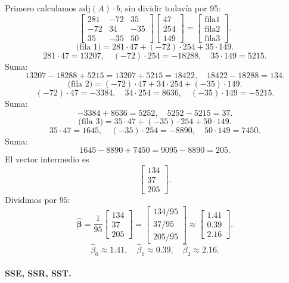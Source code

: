 \documentclass[10pt,a4paper]{article}
\begin{document}
\begin{enumerate}
Primero calculamos 
\(\mathrm{adj}(A)\cdot b\),
sin dividir todavía por 95:
\[
\begin{bmatrix}
281 & -72 & 35\\
-72 & 34 & -35\\
35 & -35 & 50
\end{bmatrix}
\begin{bmatrix}
47\\
254\\
149
\end{bmatrix}
=
\begin{bmatrix}
\text{fila1}\\
\text{fila2}\\
\text{fila3}
\end{bmatrix}.
\]
\[
\text{(fila 1)} 
= 281\cdot47 + (-72)\cdot254 + 35\cdot149.
\]
\[
281\cdot47=13207,\quad
(-72)\cdot254=-18288,\quad
35\cdot149=5215.
\]
Suma:
\[
13207 -18288 +5215= 13207 +5215=18422,\quad 18422-18288=134.
\]
\[
\text{(fila 2)}
= (-72)\cdot47 +34\cdot254 +(-35)\cdot149.
\]
\[
(-72)\cdot47=-3384,\quad
34\cdot254=8636,\quad
(-35)\cdot149=-5215.
\]
Suma:
\[
-3384+8636=5252,\quad 5252-5215=37.
\]
\[
\text{(fila 3)}
= 35\cdot47 +(-35)\cdot254 +50\cdot149.
\]
\[
35\cdot47=1645,\quad
(-35)\cdot254=-8890,\quad
50\cdot149=7450.
\]
Suma:
\[
1645-8890 +7450=9095-8890=205.
\]
El vector intermedio es
\[
\begin{bmatrix}
134\\
37\\
205
\end{bmatrix}.
\]
Dividimos por $95$:
\[
\hat{\boldsymbol{\beta}}
=
\frac{1}{95}
\begin{bmatrix}
134\\
37\\
205
\end{bmatrix}
=
\begin{bmatrix}
134/95\\
37/95\\
205/95
\end{bmatrix}
\approx
\begin{bmatrix}
1.41\\
0.39\\
2.16
\end{bmatrix}.
\]
\[
\boxed{
\hat{\beta}_0 \approx 1.41,
\quad
\hat{\beta}_1 \approx 0.39,
\quad
\hat{\beta}_2 \approx 2.16.
}
\]


\paragraph{SSE, SSR, SST.}


\end{enumerate}
\end{document}
